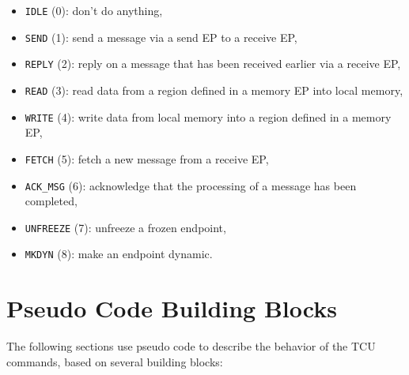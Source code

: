 \begin{itemize}
  \item \texttt{IDLE} (0): don't do anything,
  \item \texttt{SEND} (1): send a message via a send EP to a receive EP,
  \item \texttt{REPLY} (2): reply on a message that has been received earlier via a receive EP,
  \item \texttt{READ} (3): read data from a region defined in a memory EP into local memory,
  \item \texttt{WRITE} (4): write data from local memory into a region defined in a memory EP,
  \item \texttt{FETCH} (5): fetch a new message from a receive EP,
  \item \texttt{ACK\_MSG} (6): acknowledge that the processing of a message has been completed,
  \item \texttt{UNFREEZE} (7): unfreeze a frozen endpoint,
  \item \texttt{MKDYN} (8): make an endpoint dynamic.
\end{itemize}

\section{Pseudo Code Building Blocks}
\label{sec:unprivcmdspseudo}

The following sections use pseudo code to describe the behavior of the TCU commands, based on
several building blocks:

